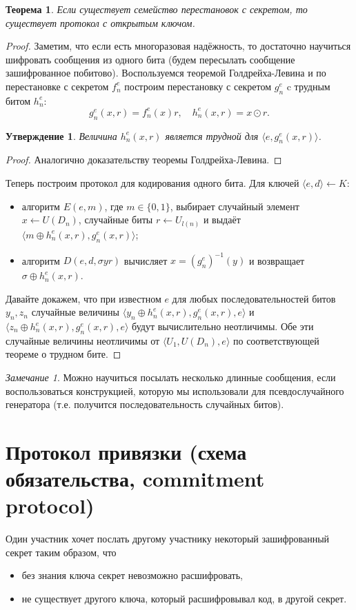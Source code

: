 \documentclass[12pt,a4paper]{article}
\newcommand{\bits}{\{0,1\}}
\theoremstyle{definition}
\theoremstyle{plain}
\newtheorem{theorem}{Теорема}[section]
\newtheorem{statement}{Утверждение}[section]
\theoremstyle{remark}
\newtheorem{remark}{Замечание}[section]
\begin{document}
\begin{theorem}
Если существует семейство перестановок с секретом, то существует протокол с открытым ключом.
\end{theorem}
\begin{proof}
Заметим, что если есть многоразовая надёжность, то достаточно научиться шифровать сообщения из
одного бита (будем пересылать сообщение зашифрованное побитово). 
Воспользуемся теоремой Голдрейха-Левина и по перестановке с секретом $f^e_n$ построим
перестановку с секретом $g^e_n$ c трудным битом $h^e_n$:
$$g^e_n(x,r) = f^e_n(x)r, \quad h^e_n(x,r) = x\odot r.$$
\begin{statement}
Величина $h^e_n(x, r)$ является трудной для $\langle e, g^e_n(x,r)\rangle$.
\end{statement}
\begin{proof}
Аналогично доказательству теоремы Голдрейха-Левина.
\end{proof}
Теперь построим протокол для кодирования одного бита. Для ключей $\langle e,d \rangle\gets K$:
\begin{itemize}
\item алгоритм $E(e, m)$, где $m \in\bits$, выбирает случайный элемент $x\gets U(D_n)$, случайные биты $r\gets U_{l(n)}$ и выдаёт $\langle m\oplus h^e_n(x,r), g_n^e(x,r)\rangle$;

\item алгоритм $D(e, d, \sigma y r)$ вычисляет $x = (g^e_n)^{-1}(y)$ и возвращает $\sigma\oplus h^e_n(x,r)$.
\end{itemize}
Давайте докажем, что при известном $e$ для любых последовательностей битов $y_n,z_n$ случайные величины $\langle y_n\oplus h^e_n(x,r), g^e_n(x,r), e \rangle$ и $\langle z_n\oplus h^e_n(x,r), g^e_n(x,r), e \rangle$ будут вычислительно неотличимы. Обе эти случайные величины неотличимы от 
$\langle U_1, U(D_n), e\rangle$ по соответствующей теореме о трудном бите.
\end{proof}
\begin{remark}
Можно научиться посылать несколько длинные сообщения, если воспользоваться конструкцией,
которую мы использовали для псевдослучайного генератора (т.е. получится последовательность случайных битов).
\end{remark}

\section{Протокол привязки (схема обязательства, commitment protocol)}
Один участник хочет послать другому участнику некоторый зашифрованный секрет таким образом,
что 
\begin{itemize}
\item без знания ключа секрет невозможно расшифровать,
\item не существует другого ключа, который расшифровывал код, в другой секрет.
\end{itemize}
\end{document}
